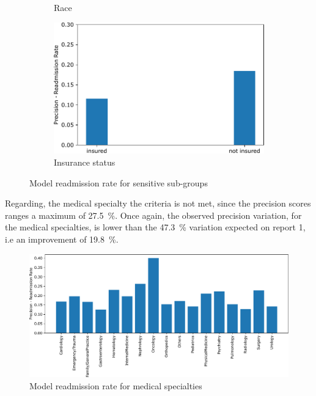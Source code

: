 \documentclass[a4paper,11pt]{article}
\begin{document}
\begin{figure}[htb]
\begin{subfigure}{0.49\textwidth}
    \caption{Race}
    \label{fig:discrim_req_sensitive_race}
\end{subfigure}
\hfill
\begin{subfigure}{0.49\textwidth}
    \includegraphics[width=\textwidth]{images/discrimination_requirement_is_insured.pdf}
    \caption{Insurance status}
    \label{fig:discrim_req_sensitive_is_insured}
\end{subfigure}
\caption{Model readmission rate for sensitive sub-groups}
\label{fig:discrim_req_sensitive}
\end{figure}

Regarding, the medical specialty the criteria is not met, since the precision scores ranges a maximum of \SI{27,5}{\percent}. Once again, the observed precision variation, for the medical specialties, is lower than the \SI{47,3}{\percent} variation expected on report 1, i.e an improvement of \SI{19,8}{\percent}.


\begin{figure}[!htb]
	\centering
	\includegraphics[width=1\textwidth]{images/discrimination_requirement_medical_specialty.pdf}
	\caption{Model readmission rate for medical specialties}
	\label{fig:discrim_req_medical_specialty}
\end{figure}
\end{document}
